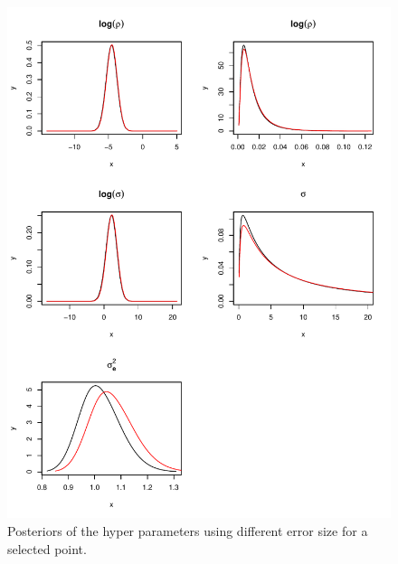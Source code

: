 \documentclass[a4paper,12pt]{article}
\begin{document}
 \begin{figure}[htbp]
 \begin{center}
 \includegraphics[scale=0.8]{fig/PointErr_hyperpar.pdf}
 \end{center}
 \caption[Posteriors of hyper parameters]{Posteriors of the hyper parameters using different error size for a selected point.}
 \label{fig:5}
 \end{figure}
 
\end{document}

